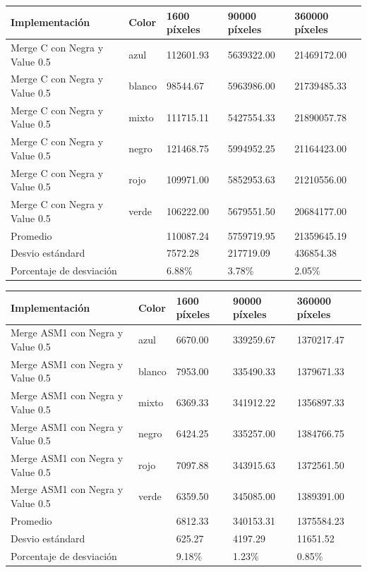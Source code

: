 \begin{tabular}{| l | l | l | l | l |}
\hline
Implementación & Color & 1600 píxeles & 90000 píxeles & 360000 píxeles\\
\hline
Merge C con Negra y Value 0.5 & azul & 112601.93 &	5639322.00 &	21469172.00\\ 
\hline
Merge C con Negra y Value 0.5 & blanco & 98544.67	& 5963986.00 &	21739485.33\\ 
\hline
Merge C con Negra y Value 0.5 & mixto & 111715.11	& 5427554.33 &	21890057.78\\ 
\hline
Merge C con Negra y Value 0.5 & negro & 121468.75	& 5994952.25 &	21164423.00\\
\hline
Merge C con Negra y Value 0.5 & rojo & 109971.00	& 5852953.63	& 21210556.00\\
\hline
Merge C con Negra y Value 0.5 & verde & 106222.00 &	5679551.50	& 20684177.00\\ 
\hline
Promedio & &  110087.24	& 5759719.95 &	21359645.19\\
\hline
Desvio estándard  && 7572.28	& 217719.09	& 436854.38\\
\hline
Porcentaje de desviación  && 6.88\%	& 3.78\% &	2.05\%\\
\hline
\end{tabular}


\begin{tabular}{| l | l | l | l | l |}
\hline
Implementación & Color & 1600 píxeles & 90000 píxeles & 360000 píxeles\\
\hline
Merge ASM1 con Negra y Value 0.5 & azul & 6670.00 &	339259.67 &	1370217.47\\ 
\hline
Merge ASM1 con Negra y Value 0.5 & blanco & 7953.00 &	335490.33	& 1379671.33\\ 
\hline
Merge ASM1 con Negra y Value 0.5 & mixto & 6369.33	& 341912.22 &	1356897.33\\ 
\hline
Merge ASM1 con Negra y Value 0.5 & negro & 6424.25 &	335257.00 &	1384766.75\\
\hline
Merge ASM1 con Negra y Value 0.5 & rojo & 7097.88 &	343915.63 &	1372561.50\\
\hline
Merge ASM1 con Negra y Value 0.5 & verde & 6359.50	& 345085.00 &	1389391.00\\ 
\hline
Promedio & &  6812.33	& 340153.31 &	1375584.23\\
\hline
Desvio estándard  && 625.27	& 4197.29	& 11651.52\\
\hline
Porcentaje de desviación  && 9.18\% &	1.23\% &	0.85\%\\
\hline
\end{tabular}


